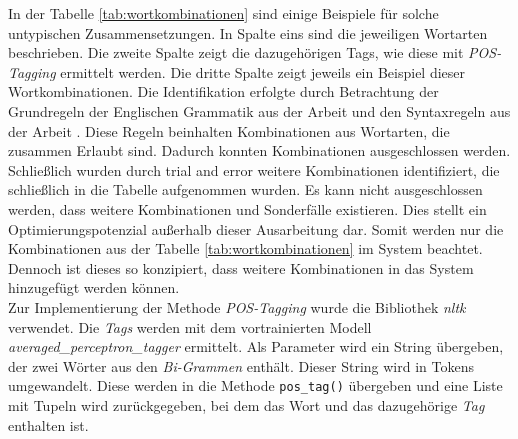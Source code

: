 In der Tabelle \ref{tab:wortkombinationen} sind einige Beispiele für solche untypischen Zusammensetzungen. In Spalte eins sind die jeweiligen Wortarten beschrieben. Die zweite Spalte zeigt die dazugehörigen Tags, wie diese mit \emph{POS-Tagging} ermittelt werden. Die dritte Spalte zeigt jeweils ein Beispiel dieser Wortkombinationen. Die Identifikation erfolgte durch Betrachtung der Grundregeln der Englischen Grammatik aus der Arbeit \cite{ogden1930basic} und den Syntaxregeln aus der Arbeit \cite{tayal2014syntax}. Diese Regeln beinhalten Kombinationen aus Wortarten, die zusammen Erlaubt sind. Dadurch konnten Kombinationen ausgeschlossen werden. Schließlich wurden durch trial and error weitere Kombinationen identifiziert, die schließlich in die Tabelle aufgenommen wurden. Es kann nicht ausgeschlossen werden, dass weitere Kombinationen und Sonderfälle existieren. Dies stellt ein Optimierungspotenzial außerhalb dieser Ausarbeitung dar. Somit werden nur die Kombinationen aus der Tabelle \ref{tab:wortkombinationen} im System beachtet. Dennoch ist dieses so konzipiert, dass weitere Kombinationen in das System hinzugefügt werden können.\\

Zur Implementierung der Methode \emph{POS-Tagging} wurde die Bibliothek \emph{nltk} verwendet. Die \emph{Tags} werden mit dem vortrainierten Modell \emph{averaged\_perceptron\_tagger} ermittelt.
Als Parameter wird ein String übergeben, der zwei Wörter aus den \emph{Bi-Grammen} enthält. Dieser String wird in Tokens umgewandelt. Diese werden in die Methode \lstinline{pos_tag()}
übergeben und eine Liste mit Tupeln wird zurückgegeben, bei dem das Wort und das dazugehörige \emph{Tag} enthalten ist.
